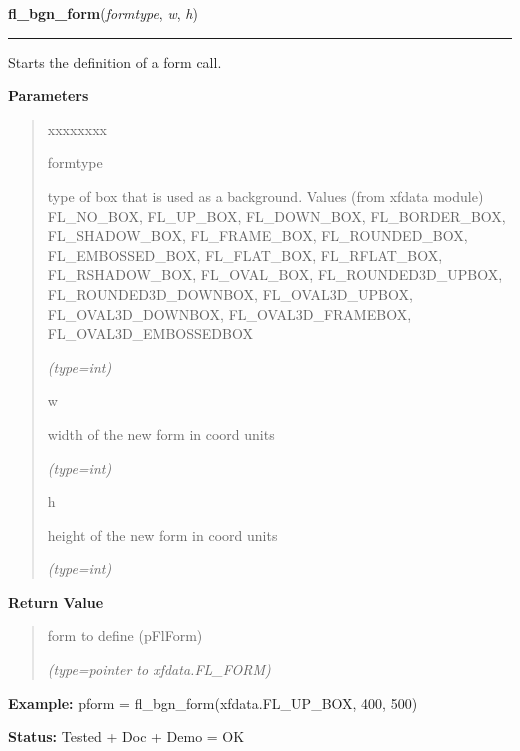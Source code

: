 \hspace{.8\funcindent}\begin{boxedminipage}{\funcwidth}

    \raggedright \textbf{fl\_bgn\_form}(\textit{formtype}, \textit{w}, \textit{h})

    \vspace{-1.5ex}

    \rule{\textwidth}{0.5\fboxrule}
\setlength{\parskip}{2ex}
    Starts the definition of a form call.

\setlength{\parskip}{1ex}
      \textbf{Parameters}
      \vspace{-1ex}

      \begin{quote}
        \begin{Ventry}{xxxxxxxx}

          \item[formtype]

          type of box that is used as a background. Values (from xfdata 
          module) FL\_NO\_BOX, FL\_UP\_BOX, FL\_DOWN\_BOX, FL\_BORDER\_BOX,
          FL\_SHADOW\_BOX, FL\_FRAME\_BOX, FL\_ROUNDED\_BOX, 
          FL\_EMBOSSED\_BOX, FL\_FLAT\_BOX, FL\_RFLAT\_BOX, 
          FL\_RSHADOW\_BOX, FL\_OVAL\_BOX, FL\_ROUNDED3D\_UPBOX, 
          FL\_ROUNDED3D\_DOWNBOX, FL\_OVAL3D\_UPBOX, FL\_OVAL3D\_DOWNBOX, 
          FL\_OVAL3D\_FRAMEBOX, FL\_OVAL3D\_EMBOSSEDBOX

            {\it (type=int)}

          \item[w]

          width of the new form in coord units

            {\it (type=int)}

          \item[h]

          height of the new form in coord units

            {\it (type=int)}

        \end{Ventry}

      \end{quote}

      \textbf{Return Value}
    \vspace{-1ex}

      \begin{quote}
      form to define (pFlForm)

      {\it (type=pointer to xfdata.FL\_FORM)}

      \end{quote}

\textbf{Example:} pform = fl\_bgn\_form(xfdata.FL\_UP\_BOX, 400, 500)



\textbf{Status:} Tested + Doc + Demo = OK



    \end{boxedminipage}

